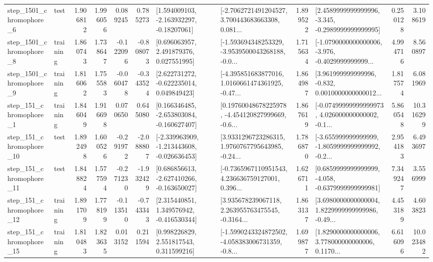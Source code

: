 \begin{tabular}{llrrrrllrlrr}
  step\_1501\_chromophore\_6 &      test &      1.906812 &    1.996056 &      0.089245 &  0.785273 &    [1.594009103, -2.163932297, -0.18207061] &  [-2.7062721491204527, 3.700443683663308, 0.081... &       1.899522 &  [2.4589999999999996, -3.345, -0.2989999999999995] &            0.250128 &          3.108619 \\
  step\_1501\_chromophore\_8 &  training &      1.860743 &    1.738647 &     -0.122096 & -0.808073 &     [0.696063957, 2.491879376, 0.027551995] &  [-1.593694348253329, -3.9539500043268188, -0.0... &       1.715634 &  [-1.0790000000000006, -3.976, -0.4029999999999... &            4.994716 &          8.560897 \\
  step\_1501\_chromophore\_9 &  training &      1.816062 &    1.755583 &     -0.060478 & -0.343524 &    [2.622731272, -0.622235014, 0.049849423] &  [-4.395851683877016, 1.0160661474361925, -0.47... &       1.864987 &  [3.961999999999996, -0.832, 0.0010000000000012... &            1.817574 &          6.081969 \\
   step\_151\_chromophore\_1 &  training &      1.846049 &    1.916698 &      0.070650 &  0.645080 &   [0.166346485, -2.653803084, -0.160627407] &  [0.19760048678225978, -4.454120827999669, -0.6... &       1.867619 &  [-0.07499999999999973, 4.026000000000002, -0.1... &            5.860548 &         10.316299 \\
  step\_151\_chromophore\_10 &      test &      1.892498 &    1.600526 &     -0.291972 & -2.088807 &  [-2.339963909, -1.213443608, -0.026636453] &  [3.9331296723286315, 1.9760767795643985, -0.24... &       1.786870 &  [-3.655999999999999, -1.8059999999999992, -0.2... &            2.954183 &          6.493697 \\
  step\_151\_chromophore\_11 &      test &      1.848824 &    1.577594 &     -0.271230 & -1.932429 &   [0.686856613, -2.627410266, -0.163650027] &  [-0.7365967110951543, 4.236636759127001, 0.396... &       1.626711 &  [0.6859999999999999, -4.058, -0.6379999999999981] &            7.349247 &          3.556999 \\
  step\_151\_chromophore\_12 &  training &      1.891709 &    1.778199 &     -0.113510 & -0.743343 &    [2.315440851, 1.349576942, -0.416530344] &  [3.935678239067118, 2.263955763475545, -0.3164... &       1.863137 &  [3.6980000000000004, 1.8229999999999986, -0.49... &            4.453189 &          4.603823 \\
  step\_151\_chromophore\_15 &  training &      1.810483 &    1.823635 &      0.013152 &  0.211594 &     [0.998226829, 2.551817543, 0.311599216] &  [-1.5990243324872502, -4.058383006731359, -0.8... &       1.699877 &  [1.8290000000000006, 3.778000000000006, 0.1170... &            6.616096 &         10.023482 \\

\end{tabular}
